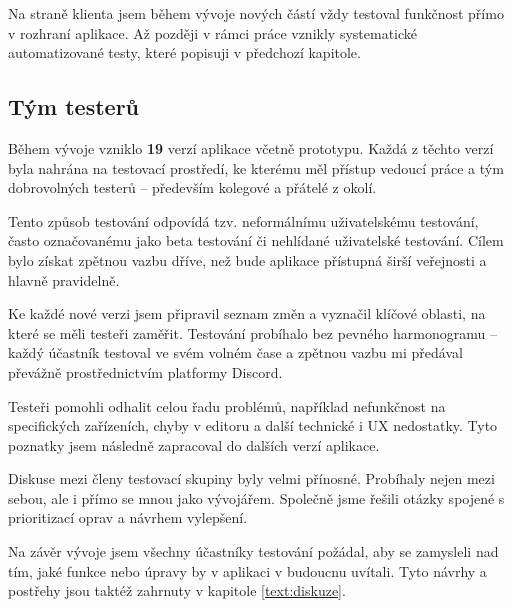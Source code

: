 Na straně klienta jsem během vývoje nových částí vždy testoval funkčnost přímo v rozhraní aplikace.
Až později v rámci práce vznikly systematické automatizované testy, které popisuji v předchozí kapitole.

\subsection{Tým testerů}

Během vývoje vzniklo \textbf{19} verzí aplikace včetně prototypu. 
Každá z těchto verzí byla nahrána na testovací prostředí, ke kterému měl přístup vedoucí práce a tým dobrovolných testerů -- především kolegové a přátelé z okolí.

Tento způsob testování odpovídá tzv. neformálnímu uživatelskému testování, často označovanému jako beta testování či nehlídané uživatelské testování. 
Cílem bylo získat zpětnou vazbu dříve, než bude aplikace přístupná širší veřejnosti a hlavně pravidelně.

Ke každé nové verzi jsem připravil seznam změn a vyznačil klíčové oblasti, na které se měli testeři zaměřit. 
Testování probíhalo bez pevného harmonogramu -- každý účastník testoval ve svém volném čase a zpětnou vazbu mi předával převážně prostřednictvím platformy Discord.

Testeři pomohli odhalit celou řadu problémů, například nefunkčnost na specifických zařízeních, chyby v editoru a další technické i UX nedostatky. 
Tyto poznatky jsem následně zapracoval do dalších verzí aplikace.

Diskuse mezi členy testovací skupiny byly velmi přínosné.
Probíhaly nejen mezi sebou, ale i přímo se mnou jako vývojářem. 
Společně jsme řešili otázky spojené s prioritizací oprav a návrhem vylepšení.

Na závěr vývoje jsem všechny účastníky testování požádal, aby se zamysleli nad tím, jaké funkce nebo úpravy by v aplikaci v budoucnu uvítali. 
Tyto návrhy a postřehy jsou taktéž zahrnuty v kapitole \ref{text:diskuze}.



